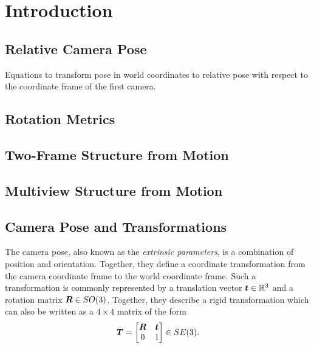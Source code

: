 \chapter{Introduction}

	\section{Relative Camera Pose}
		Equations to transform pose in world coordinates to relative pose with respect to the coordinate frame of the first camera.

	\section{Rotation Metrics}
	\cite{huynh2009metrics}
	
	\section{Two-Frame Structure from Motion}
	
	\section{Multiview Structure from Motion}
	
	\section{Camera Pose and Transformations}
		The camera pose, also known as the \emph{extrinsic parameters}, is a combination of position and orientation.
		Together, they define a coordinate transformation from the camera coordinate frame to the world coordinate frame.
		Such a transformation is commonly represented by a translation vector $\bm{t} \in \mathbb{R}^3$ and a rotation matrix $\bm{R} \in SO(3)$. 
		Together, they describe a rigid transformation which can also be written as a $4 \times 4$ matrix of the form
		\begin{equation}
			\bm{T} = 
			\begin{bmatrix}
				\bm{R} 	& \bm{t} \\
				0 			& 1
			\end{bmatrix} 
			\in SE(3).
		\end{equation}
		
